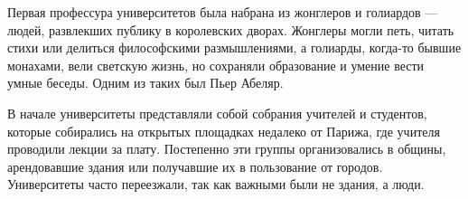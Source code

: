 
Первая профессура университетов была набрана из жонглеров и голиардов — людей, развлекших публику в королевских дворах. Жонглеры могли петь, читать стихи или делиться философскими размышлениями, а голиарды, когда-то бывшие монахами, вели светскую жизнь, но сохраняли образование и умение вести умные беседы. Одним из таких был Пьер Абеляр.



В начале университеты представляли собой собрания учителей и студентов, которые собирались на открытых площадках недалеко от Парижа, где учителя проводили лекции за плату. Постепенно эти группы организовались в общины, арендовавшие здания или получавшие их в пользование от городов. Университеты часто переезжали, так как важными были не здания, а люди.

